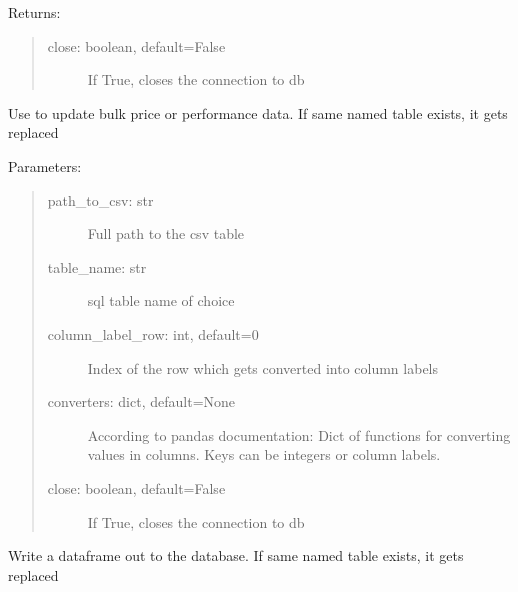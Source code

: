 \documentclass[letterpaper,10pt,english,openany]{sphinxmanual}
\begin{document}
\begin{fulllineitems}
\begin{fulllineitems}
Returns:
\begin{quote}
\begin{description}
\item[{close: boolean, default=False}] \leavevmode
If True, closes the connection to db

\end{description}
\end{quote}

\end{fulllineitems}


\begin{fulllineitems}
\label{\detokenize{source/mswh.comm:mswh.comm.sql.Sql.csv2table}}
Use to update bulk price or performance data.
If same named table exists, it gets replaced

Parameters:
\begin{quote}
\begin{description}
\item[{path\_to\_csv: str}] \leavevmode
Full path to the csv table

\item[{table\_name: str}] \leavevmode
sql table name of choice

\item[{column\_label\_row: int, default=0}] \leavevmode
Index of the row which gets
converted into column labels

\item[{converters: dict, default=None}] \leavevmode
According to pandas documentation:
Dict of functions for converting
values in columns. Keys can be integers
or column labels.

\item[{close: boolean, default=False}] \leavevmode
If True, closes the connection to db

\end{description}
\end{quote}

\end{fulllineitems}


\begin{fulllineitems}
\label{\detokenize{source/mswh.comm:mswh.comm.sql.Sql.pd2table}}
Write a dataframe out to the database.
If same named table exists, it gets replaced


\end{fulllineitems}
\end{fulllineitems}
\end{document}
